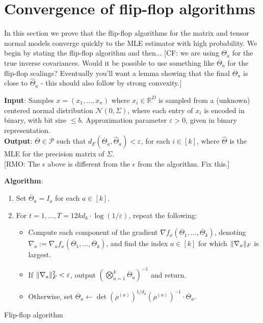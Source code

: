 \documentclass{article}
\DeclarePairedDelimiter{\norm}{\lVert}{\rVert}
\newcommand{\R}{{\mathbb{R}}}
\newcommand{\otheta}{\overline{\Theta}}
\newcommand{\htheta}{\hat{\Theta}}
\newcommand\eps{\varepsilon}
\newcommand\cN{\mathcal{N}}
\newcommand\SPD{\mathcal{P}}
\newcommand\samp{x}
\newcommand{\CF}[1]{{\color{purple}[CF: #1]}}
\newcommand{\RMO}[1]{{\color{red}[RMO: #1]}}
\begin{document}
\newpage
\section{Convergence of flip-flop algorithms}

In this section we prove that the flip-flop algorithms for the matrix and tensor normal models converge quickly to the MLE estimator with high probability. We begin by stating the flip-flop algorithm and then... \CF{we are using $\Theta_a$ for the true inverse covariances. Would it be possible to use something like $\overline{\Theta}_a$ for the flip-flop scalings? Eventually you'll want a lemma showing that the final $\overline{\Theta}_a$ is close to $\widehat{\Theta}_a$ - this should also follow by strong convexity.}

\begin{Algorithm}
\textbf{Input}: Samples $\samp = (\samp_1, \ldots, \samp_n)$ where $\samp_i \in \R^D$ is sampled from a (unknown) centered normal distribution $\cN(0, \Sigma)$, where each entry of $\samp_i$ is encoded in binary, with bit size $\le b$. Approximation parameter $\eps > 0$, given in binary representation. \\[.3ex]

\textbf{Output}: $\otheta \in \SPD$ such that $d_F(\otheta_a, \htheta_a) < \eps$, for each $i \in [k]$, where $\htheta$ is the MLE for the precision matrix of $\Sigma$. \\[.3ex]
\RMO{The $\epsilon$ above is different from the $\epsilon$ from the algorithm. Fix this.}

\textbf{Algorithm}:
\begin{enumerate}
\item\label{it:flip-flop step 1} Set $\otheta_a = I_a$ for each $a \in [k]$.
\item\label{it:flip-flop step 2} For $t=1,\dots,T = 12 k d_k \cdot \log(1/\eps)$, repeat the following:
\begin{itemize}
\item Compute each component of the gradient $\nabla f_{\samp}(\otheta_1, \ldots, \otheta_k)$, denoting $\nabla_a := \nabla_a f_{\samp}(\otheta_1, \ldots, \otheta_k)$, and find the index $a \in [k]$ for which $\norm{\nabla_a}_F$ is largest. 
\item
If $\norm{\nabla_a}_F^2 < \eps$, output $\left( \bigotimes_{a =1}^k \otheta_a \right)^{-1}$ and return.
\item Otherwise, set $\otheta_a \leftarrow \det(\rho^{(a)})^{1/d_a} (\rho^{(a)})^{-1} \cdot \otheta_a$.
\end{itemize}
\end{enumerate}
\caption{Flip-flop algorithm}\label{alg:flip-flop}
\end{Algorithm}
\end{document}
